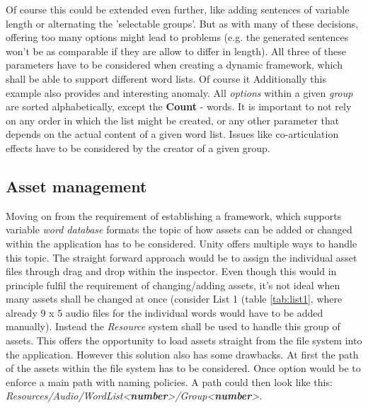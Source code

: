 \documentclass[a4paper,11pt]{article}%
\renewcommand{\\}{\vspace*{0.5\baselineskip} \newline}
\begin{document}
\vspace{5mm}
Of course this could be extended even further, like adding sentences of variable length or alternating the 'selectable groups'. But as with many of these decisions, offering too many options might lead to problems (e.g. the generated sentences won't be as comparable if they are allow to differ in length).
\newline
\newline
All three of these parameters have to be considered when creating a dynamic framework, which shall be able to support different word lists. Of course it 
\newline
Additionally this example also provides and interesting anomaly. All \textit{options} within a given \textit{group} are sorted alphabetically, except the \textbf{Count} - words. It is important to not rely on any order in which the list might be created, or any other parameter that depends on the actual content of a given word list.
\newline
\newline
Issues like co-articulation effects have to be considered by the creator of a given group.


\subsection{Asset management}
\label{sec:asset_management}
Moving on from the requirement of establishing a framework, which supports variable \textit{word database} formats the topic of how assets can be added or changed within the application has to be considered.
\newline
\newline
Unity offers multiple ways to handle this topic. The straight forward approach would be to assign the individual asset files through drag and drop within the inspector. Even though this would in principle fulfil the requirement of changing/adding assets, it's not ideal when many assets shall be changed at once (consider List 1 (table \ref{tab:list1}, where already 9 x 5 audio files for the individual words would have to be added manually). 
\newline
\newline
Instead the \textit{Resource} system shall be used to handle this group of assets. This offers the opportunity to load assets straight from the file system into the application. However this solution also has some drawbacks. At first the path of the assets within the file system has to be considered. Once option would be to enforce a main path with naming policies. A path could then look like this: \textit{Resources/Audio/WordList<\textbf{number}>/Group<\textbf{number}>}.
\end{document}
